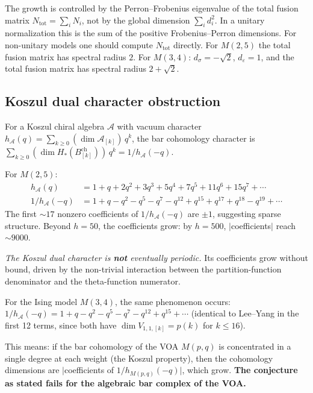 \documentclass[11pt]{article}
\newcommand{\cA}{\mathcal{A}}
\providecommand{\ClaimStatusProvedHere}{\textup{proved here}}
\begin{document}
\begin{remark}
The growth is controlled by the Perron--Frobenius eigenvalue of
the total fusion matrix $N_{\mathrm{tot}}=\sum_i N_i$, not by
the global dimension $\sum_i d_i^2$.  In a unitary normalization
this is the sum of the positive Frobenius--Perron dimensions.
For non-unitary models one should compute $N_{\mathrm{tot}}$
directly.
For $M(2,5)$ the total fusion matrix has spectral radius $2$.
For $M(3,4)$: $d_\sigma = -\sqrt{2}$, $d_\varepsilon = 1$,
and the total fusion matrix has spectral radius $2 + \sqrt{2}$.
\end{remark}

\subsection{Koszul dual character obstruction}
\label{subsec:mp-koszul-dual}

\begin{computation}[Koszul dual character; \ClaimStatusProvedHere]
\label{comp:koszul-dual-obstruction}
For a Koszul chiral algebra $\cA$ with vacuum character
$h_\cA(q) = \sum_{k \ge 0} (\dim \cA_{[k]})\, q^k$,
the bar cohomology character is
$\sum_{k \ge 0} (\dim H_*(B^\mathrm{ch}_{[k]}))\, q^k
= 1/h_\cA(-q)$.

For $M(2,5)$:
\begin{align*}
h_\cA(q) &= 1 + q + 2q^2 + 3q^3 + 5q^4 + 7q^5 + 11q^6 + 15q^7 + \cdots \\
1/h_\cA(-q) &= 1 + q - q^2 - q^5 - q^7 - q^{12} + q^{15} + q^{17} + q^{18} - q^{19} + \cdots
\end{align*}
The first $\sim 17$ nonzero coefficients of $1/h_\cA(-q)$ are
$\pm 1$, suggesting sparse structure.  Beyond $h = 50$, the
coefficients grow: by $h = 500$, $|$coefficients$|$ reach $\sim 9000$.

\emph{The Koszul dual character is \textbf{not} eventually periodic.}
Its coefficients grow without bound, driven by the non-trivial
interaction between the partition-function denominator and the
theta-function numerator.

For the Ising model $M(3,4)$, the same phenomenon occurs:
$1/h_\cA(-q) = 1 + q - q^2 - q^5 - q^7 - q^{12} + q^{15} + \cdots$
(identical to Lee--Yang in the first 12 terms, since both have
$\dim V_{1,1,[k]} = p(k)$ for $k \le 16$).

This means: if the bar cohomology of the VOA $M(p,q)$ is
concentrated in a single degree at each weight (the Koszul
property), then the cohomology dimensions are
$|$coefficients of $1/h_{M(p,q)}(-q)|$, which grow.
\textbf{The conjecture as stated fails for the algebraic bar complex
of the VOA.}
\end{computation}
\end{document}
